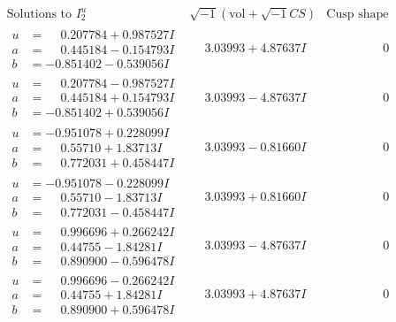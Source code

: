 \documentclass[1p]{elsarticle_modified}
\theoremstyle{definition}
\newcommand{\I}{\sqrt{-1}}
\begin{document}
$$\begin{array}{c|c|c}  
\text{Solutions to }I^u_{2}& \I (\text{vol} + \sqrt{-1}CS) & \text{Cusp shape}\\
 \hline 
\begin{aligned}
u &= \phantom{-}0.207784 + 0.987527 I \\
a &= \phantom{-}0.445184 - 0.154793 I \\
b &= -0.851402 - 0.539056 I\end{aligned}
 & \phantom{-}3.03993 + 4.87637 I & \phantom{-0.000000 } 0 \\ \hline\begin{aligned}
u &= \phantom{-}0.207784 - 0.987527 I \\
a &= \phantom{-}0.445184 + 0.154793 I \\
b &= -0.851402 + 0.539056 I\end{aligned}
 & \phantom{-}3.03993 - 4.87637 I & \phantom{-0.000000 } 0 \\ \hline\begin{aligned}
u &= -0.951078 + 0.228099 I \\
a &= \phantom{-}0.55710 + 1.83713 I \\
b &= \phantom{-}0.772031 + 0.458447 I\end{aligned}
 & \phantom{-}3.03993 - 0.81660 I & \phantom{-0.000000 } 0 \\ \hline\begin{aligned}
u &= -0.951078 - 0.228099 I \\
a &= \phantom{-}0.55710 - 1.83713 I \\
b &= \phantom{-}0.772031 - 0.458447 I\end{aligned}
 & \phantom{-}3.03993 + 0.81660 I & \phantom{-0.000000 } 0 \\ \hline\begin{aligned}
u &= \phantom{-}0.996696 + 0.266242 I \\
a &= \phantom{-}0.44755 - 1.84281 I \\
b &= \phantom{-}0.890900 - 0.596478 I\end{aligned}
 & \phantom{-}3.03993 - 4.87637 I & \phantom{-0.000000 } 0 \\ \hline\begin{aligned}
u &= \phantom{-}0.996696 - 0.266242 I \\
a &= \phantom{-}0.44755 + 1.84281 I \\
b &= \phantom{-}0.890900 + 0.596478 I\end{aligned}
 & \phantom{-}3.03993 + 4.87637 I & \phantom{-0.000000 } 0 \\ \hline\begin{aligned}

\end{aligned}
\end{array}$$
\end{document}
